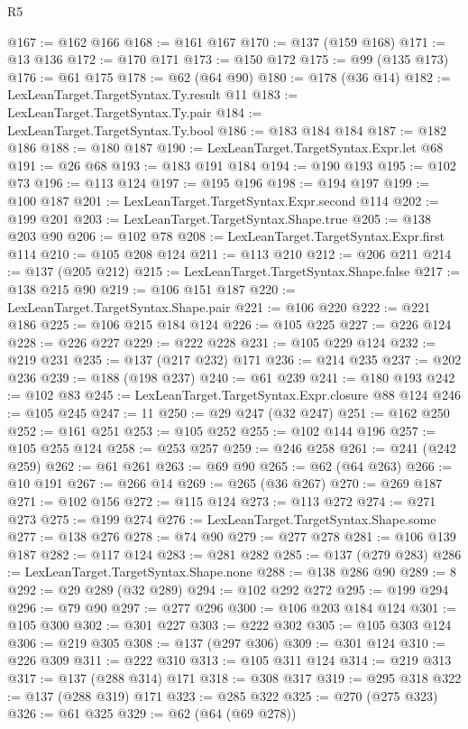 \begin{lexlean}{R5}
\begin{coremodule}
@167 := @162 @166
@168 := @161 @167
@170 := @137 (@159 @168)
@171 := @13 @136
@172 := @170 @171
@173 := @150 @172
@175 := @99 (@135 @173)
@176 := @61 @175
@178 := @62 (@64 @90)
@180 := @178 (@36 @14)
@182 := LexLeanTarget.TargetSyntax.Ty.result @11
@183 := LexLeanTarget.TargetSyntax.Ty.pair
@184 := LexLeanTarget.TargetSyntax.Ty.bool
@186 := @183 @184 @184
@187 := @182 @186
@188 := @180 @187
@190 := LexLeanTarget.TargetSyntax.Expr.let @68
@191 := @26 @68
@193 := @183 @191 @184
@194 := @190 @193
@195 := @102 @73
@196 := @113 @124
@197 := @195 @196
@198 := @194 @197
@199 := @100 @187
@201 := LexLeanTarget.TargetSyntax.Expr.second @114
@202 := @199 @201
@203 := LexLeanTarget.TargetSyntax.Shape.true
@205 := @138 @203 @90
@206 := @102 @78
@208 := LexLeanTarget.TargetSyntax.Expr.first @114
@210 := @105 @208 @124
@211 := @113 @210
@212 := @206 @211
@214 := @137 (@205 @212)
@215 := LexLeanTarget.TargetSyntax.Shape.false
@217 := @138 @215 @90
@219 := @106 @151 @187
@220 := LexLeanTarget.TargetSyntax.Shape.pair
@221 := @106 @220
@222 := @221 @186
@225 := @106 @215 @184 @124
@226 := @105 @225
@227 := @226 @124
@228 := @226 @227
@229 := @222 @228
@231 := @105 @229 @124
@232 := @219 @231
@235 := @137 (@217 @232) @171
@236 := @214 @235
@237 := @202 @236
@239 := @188 (@198 @237)
@240 := @61 @239
@241 := @180 @193
@242 := @102 @83
@245 := LexLeanTarget.TargetSyntax.Expr.closure @88 @124
@246 := @105 @245
@247 := 11
@250 := @29 @247 (@32 @247)
@251 := @162 @250
@252 := @161 @251
@253 := @105 @252
@255 := @102 @144 @196
@257 := @105 @255 @124
@258 := @253 @257
@259 := @246 @258
@261 := @241 (@242 @259)
@262 := @61 @261
@263 := @69 @90
@265 := @62 (@64 @263)
@266 := @10 @191
@267 := @266 @14
@269 := @265 (@36 @267)
@270 := @269 @187
@271 := @102 @156
@272 := @115 @124
@273 := @113 @272
@274 := @271 @273
@275 := @199 @274
@276 := LexLeanTarget.TargetSyntax.Shape.some
@277 := @138 @276
@278 := @74 @90
@279 := @277 @278
@281 := @106 @139 @187
@282 := @117 @124
@283 := @281 @282
@285 := @137 (@279 @283)
@286 := LexLeanTarget.TargetSyntax.Shape.none
@288 := @138 @286 @90
@289 := 8
@292 := @29 @289 (@32 @289)
@294 := @102 @292 @272
@295 := @199 @294
@296 := @79 @90
@297 := @277 @296
@300 := @106 @203 @184 @124
@301 := @105 @300
@302 := @301 @227
@303 := @222 @302
@305 := @105 @303 @124
@306 := @219 @305
@308 := @137 (@297 @306)
@309 := @301 @124
@310 := @226 @309
@311 := @222 @310
@313 := @105 @311 @124
@314 := @219 @313
@317 := @137 (@288 @314) @171
@318 := @308 @317
@319 := @295 @318
@322 := @137 (@288 @319) @171
@323 := @285 @322
@325 := @270 (@275 @323)
@326 := @61 @325
@329 := @62 (@64 (@69 @278))

\end{coremodule}
\end{lexlean}
